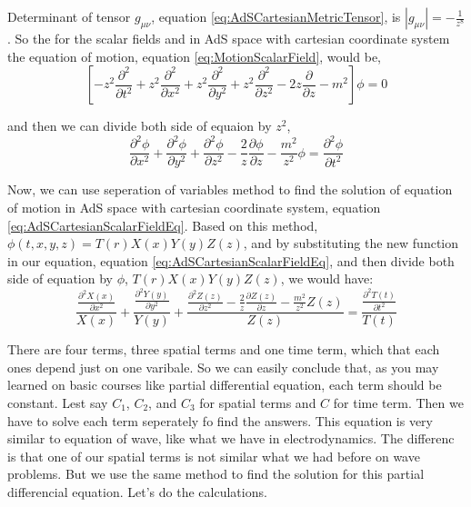 Determinant of tensor $g_{\mu\nu}$, equation \ref{eq:AdSCartesianMetricTensor}, is $|g_{\mu\nu}| = - \frac{1}{z^8}$. So the for the scalar fields and in AdS space with cartesian coordinate system the equation of motion, equation \ref{eq:MotionScalarField}, would be,\\

\begin{equation}
    \left[ - z^2 \frac{\partial^2}{\partial t^2} + z^2 \frac{\partial^2}{\partial x^2} + z^2 \frac{\partial^2}{\partial y^2} + z^2 \frac{\partial^2}{\partial z^2} - 2 z \frac{\partial}{\partial z} - m^2 \right] \phi=0
\end{equation}

and then we can divide both side of equaion by $z^2$,\\

\begin{equation} \label{eq:AdSCartesianScalarFieldEq}
    \frac{\partial^2\phi}{\partial x^2} + \frac{\partial^2\phi}{\partial y^2} + \frac{\partial^2\phi}{\partial z^2} - \frac{2}{z} \frac{\partial\phi}{\partial z} - \frac{m^2}{z^2}\phi = \frac{\partial^2 \phi}{\partial t^2}
\end{equation}

Now, we can use seperation of variables method to find the solution of equation of motion in AdS space with cartesian coordinate system, equation \ref{eq:AdSCartesianScalarFieldEq}. Based on this method, $\phi(t,x,y,z) = T(r)X(x)Y(y)Z(z)$, and by substituting the new function in our equation, equation \ref{eq:AdSCartesianScalarFieldEq}, and then divide both side of equation by $\phi$, $T(r)X(x)Y(y)Z(z)$, we would have: \\

\begin{equation}
    \frac{\frac{\partial^2X(x)}{\partial x^2}}{X(x)} + \frac{\frac{\partial^2Y(y)}{\partial y^2}}{Y(y)} + \frac{\frac{\partial^2Z(z)}{\partial z^2} - \frac{2}{z}\frac{\partial Z(z)}{\partial z} - \frac{m^2}{ z^2}Z(z)}{Z(z)} = \frac{\frac{\partial^2 T(t)}{\partial t^2}}{T(t)}
\end{equation}

There are four terms, three spatial terms and one time term, which that each ones depend just on one varibale. So we can easily conclude that, as you may learned on basic courses like partial differential equation, each term should be constant. Lest say $C_1$, $C_2$, and $C_3$ for spatial terms and $C$ for time term. Then we have to solve each term seperately fo find the answers. This equation is very similar to equation of wave, like what we have in electrodynamics. The differenc is that one of our spatial terms is not similar what we had before on wave problems. But we use the same method to find the solution for this partial differencial equation. Let's do the calculations.\\

